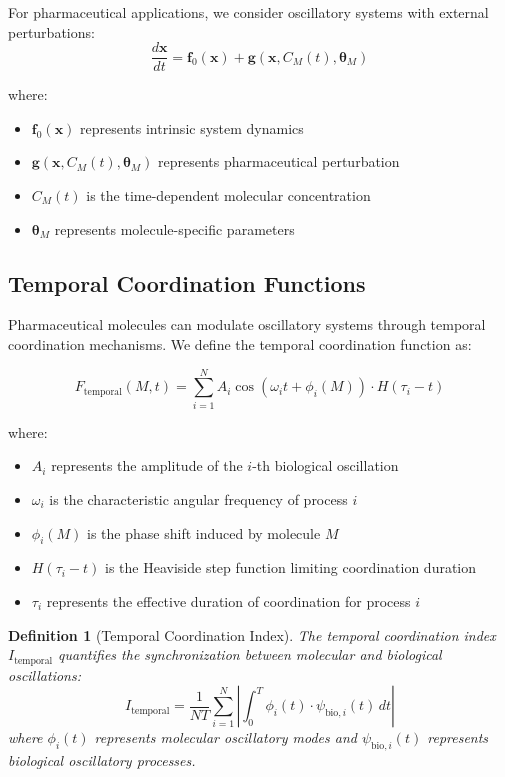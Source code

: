\documentclass[12pt,a4paper]{article}
\newtheorem{definition}{Definition}[section]
\begin{document}
For pharmaceutical applications, we consider oscillatory systems with external perturbations:
\begin{equation}
\frac{d\mathbf{x}}{dt} = \mathbf{f}_0(\mathbf{x}) + \mathbf{g}(\mathbf{x}, C_M(t), \boldsymbol{\theta}_M)
\end{equation}

where:
\begin{itemize}
\item $\mathbf{f}_0(\mathbf{x})$ represents intrinsic system dynamics
\item $\mathbf{g}(\mathbf{x}, C_M(t), \boldsymbol{\theta}_M)$ represents pharmaceutical perturbation
\item $C_M(t)$ is the time-dependent molecular concentration
\item $\boldsymbol{\theta}_M$ represents molecule-specific parameters
\end{itemize}

\subsection{Temporal Coordination Functions}

Pharmaceutical molecules can modulate oscillatory systems through temporal coordination mechanisms. We define the temporal coordination function as:

\begin{equation}
F_{\text{temporal}}(M, t) = \sum_{i=1}^{N} A_i \cos(\omega_i t + \phi_i(M)) \cdot H(\tau_i - t)
\end{equation}

where:
\begin{itemize}
\item $A_i$ represents the amplitude of the $i$-th biological oscillation
\item $\omega_i$ is the characteristic angular frequency of process $i$
\item $\phi_i(M)$ is the phase shift induced by molecule $M$
\item $H(\tau_i - t)$ is the Heaviside step function limiting coordination duration
\item $\tau_i$ represents the effective duration of coordination for process $i$
\end{itemize}

\begin{definition}[Temporal Coordination Index]
The temporal coordination index $I_{\text{temporal}}$ quantifies the synchronization between molecular and biological oscillations:
\begin{equation}
I_{\text{temporal}} = \frac{1}{N T} \sum_{i=1}^{N} \left| \int_0^T \phi_i(t) \cdot \psi_{\text{bio},i}(t) \, dt \right|
\end{equation}
where $\phi_i(t)$ represents molecular oscillatory modes and $\psi_{\text{bio},i}(t)$ represents biological oscillatory processes.
\end{definition}
\end{document}
